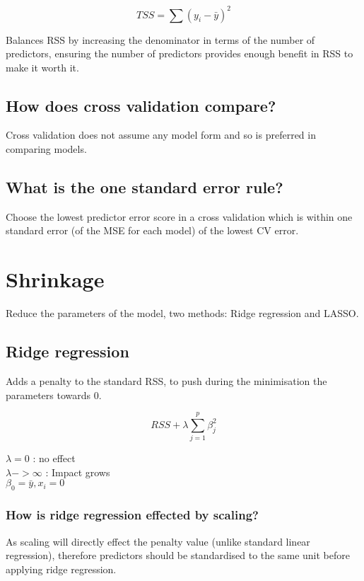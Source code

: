 \documentclass[11pt]{scrartcl} %
\begin{document}
\begin{equation}
	TSS = \sum{(y_i - \bar{y})^2}
\end{equation}

Balances RSS by increasing the denominator in terms of the number of predictors, ensuring
the number of predictors provides enough benefit in RSS to make it worth it.

\subsection{How does cross validation compare?}

Cross validation does not assume any model form and so is preferred in comparing models.

\subsection{What is the one standard error rule?}

Choose the lowest predictor error score in a cross validation which is within one standard error (of the MSE for each model)
of the lowest CV error.

\section{Shrinkage}

Reduce the parameters of the model, two methods: Ridge regression and LASSO.

\subsection{Ridge regression}

Adds a penalty to the standard RSS, to push during the minimisation the parameters towards 0.

\begin{equation}
	RSS + \lambda \sum^p_{j=1}{\beta^2_j}
\end{equation}

\(\lambda =0\) : no effect\\
\(\lambda ->\infty \) : Impact grows\\
\(\beta_0 = \bar{y},x_i=0\) 

\subsubsection{How is ridge regression effected by scaling?}

As scaling will directly effect the penalty value (unlike standard linear regression), therefore
predictors should be standardised to the same unit before applying ridge regression.
\end{document}
